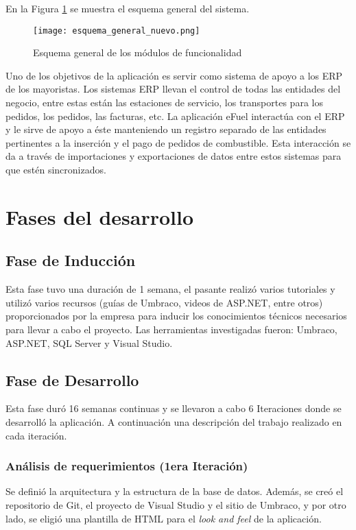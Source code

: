 En la Figura \ref{fig:esquema_general_nuevo} se muestra el esquema general del sistema.

\vspace{0.3cm}

\begin{figure}[ht]
    \texttt{[image: esquema\_general\_nuevo.png]}
    \caption{Esquema general de los módulos de funcionalidad}
    \label{fig:esquema_general_nuevo}
    \centering
\end{figure}

Uno de los objetivos de la aplicación es servir como sistema de apoyo a los ERP de los mayoristas. Los sistemas ERP llevan el control de todas las entidades del negocio, entre estas están las estaciones de servicio, los transportes para los pedidos, los pedidos, las facturas, etc. La aplicación eFuel interactúa con el \ac{ERP} y le sirve de apoyo a éste manteniendo un registro separado de las entidades pertinentes a la inserción y el pago de pedidos de combustible. Esta interacción se da a través de importaciones y exportaciones de datos entre estos sistemas para que estén sincronizados.

\section{Fases del desarrollo}
\subsection{Fase de Inducción}
Esta fase tuvo una duración de 1 semana, el pasante realizó varios tutoriales y utilizó varios recursos (guías de Umbraco, videos de ASP.NET, entre otros) proporcionados por la empresa para inducir los conocimientos técnicos necesarios para llevar a cabo el proyecto. Las herramientas investigadas fueron: Umbraco, ASP.NET, SQL Server y Visual Studio.

\subsection{Fase de Desarrollo}
Esta fase duró 16 semanas continuas y se llevaron a cabo 6 Iteraciones donde se desarrolló la aplicación. A continuación una descripción del trabajo realizado en cada iteración.

\subsubsection{Análisis de requerimientos (1era Iteración)}
Se definió la arquitectura y la estructura de la base de datos. Además, se creó el repositorio de Git, el proyecto de Visual Studio y el sitio de Umbraco, y por otro lado, se eligió una plantilla de HTML para el \emph{look and feel} de la aplicación.

